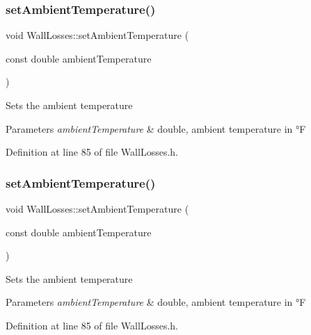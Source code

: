 \subsubsection{\texorpdfstring{set\+Ambient\+Temperature()}{setAmbientTemperature()}\hspace{0.1cm}{\footnotesize\ttfamily [1/3]}}
{\footnotesize\ttfamily void Wall\+Losses\+::set\+Ambient\+Temperature (\begin{DoxyParamCaption}\item[{const double}]{ambient\+Temperature }\end{DoxyParamCaption})\hspace{0.3cm}{\ttfamily [inline]}}

Sets the ambient temperature 
\begin{DoxyParams}{Parameters}
{\em ambient\+Temperature} & double, ambient temperature in °F \\
\hline
\end{DoxyParams}


Definition at line 85 of file Wall\+Losses.\+h.

\mbox{\label{class_wall_losses_a08a8f4c9add0ce78733be4558cc8410b}} 
\subsubsection{\texorpdfstring{set\+Ambient\+Temperature()}{setAmbientTemperature()}\hspace{0.1cm}{\footnotesize\ttfamily [2/3]}}
{\footnotesize\ttfamily void Wall\+Losses\+::set\+Ambient\+Temperature (\begin{DoxyParamCaption}\item[{const double}]{ambient\+Temperature }\end{DoxyParamCaption})\hspace{0.3cm}{\ttfamily [inline]}}

Sets the ambient temperature 
\begin{DoxyParams}{Parameters}
{\em ambient\+Temperature} & double, ambient temperature in °F \\
\hline
\end{DoxyParams}


Definition at line 85 of file Wall\+Losses.\+h.

\mbox{\label{class_wall_losses_a08a8f4c9add0ce78733be4558cc8410b}} 
